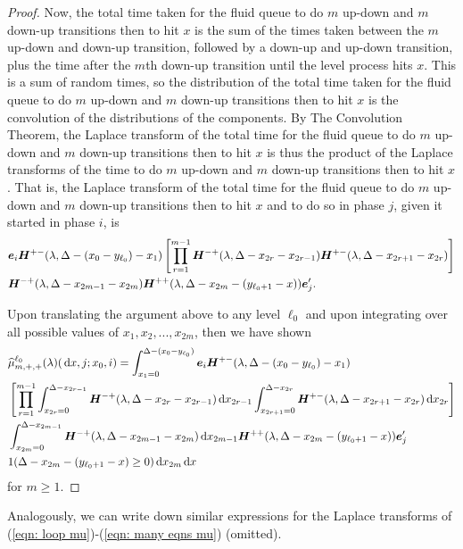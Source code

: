 \begin{proof}
Now, the total time taken for the fluid queue to do \(m\) up-down and \(m\) down-up transitions then to hit \(x\) is the sum of the times taken between the \(m\) up-down and down-up transition, followed by a down-up and up-down transition, plus the time after the \(m\)th down-up transition until the level process hits \(x\). This is a sum of random times, so the distribution of the total time taken for the fluid queue to do \(m\) up-down and \(m\) down-up transitions then to hit \(x\) is the convolution of the distributions of the components. By The Convolution Theorem, the Laplace transform of the total time for the fluid queue to do \(m\) up-down and \(m\) down-up transitions then to hit \(x\) is thus the product of the Laplace transforms of the time to do \(m\) up-down and \(m\) down-up transitions then to hit \(x\). That is, the Laplace transform of the total time for the fluid queue to do \(m\) up-down and \(m\) down-up transitions then to hit \(x\) and to do so in phase \(j\), given it started in phase \(i\), is
\begin{align*}
	\nonumber&\boldsymbol e_i \boldsymbol H^{+-}(\lambda,\Delta-(x_0-y_{\ell_0})-x_1)  
	\nonumber\left[\prod_{r=1}^{m-1}\boldsymbol H^{-+}(\lambda,\Delta-x_{2r}-x_{2r-1})\boldsymbol H^{+-}(\lambda,\Delta-x_{2r+1}-x_{2r})\right]
	\\& \boldsymbol H^{-+}(\lambda,\Delta -x_{2m-1} - x_{2m}) \boldsymbol H^{++}(\lambda,\Delta -x_{2m}- (y_{\ell_0+1}- x))\boldsymbol e_j'{}.
\end{align*} 

Upon translating the argument above to any level \(\ell_0\) and upon integrating over all possible values of \(x_1,x_2,...,x_{2m}\), then we have shown 
\begin{align}
	\nonumber&\widehat \mu^{\ell_0}_{m,+,+}(\lambda)( \, \mathrm{d} x,j;x_0,i) = \int_{x_1 = 0}^{\Delta-(x_0-y_{\ell_0})} \boldsymbol e_i \boldsymbol H^{+-}(\lambda,\Delta-(x_0-y_{\ell_0})-x_1)  
	\\&  \nonumber\left[\prod_{r=1}^{m-1} \int_{x_{2r}=0}^{\Delta-x_{2r-1}} \boldsymbol H^{-+}(\lambda,\Delta-x_{2r}-x_{2r-1})\, \mathrm{d} x_{2r-1}\int_{x_{2r+1}=0}^{\Delta-x_{2r}}\boldsymbol H^{+-}(\lambda,\Delta-x_{2r+1}-x_{2r})\, \mathrm{d} x_{2r}\right]
	\\& \int_{x_{2m}=0}^{\Delta-x_{2m-1}} \boldsymbol H^{-+}(\lambda,\Delta -x_{2m-1} - x_{2m}) \, \mathrm{d} x_{2m-1}\boldsymbol H^{++}(\lambda,\Delta -x_{2m}- (y_{\ell_0+1}- x))\boldsymbol e_j'{} \nonumber	
	\\& 1(\Delta-x_{2m}-(y_{\ell_0+1}-x)\geq 0)\, \mathrm{d} x_{2m} \, \mathrm{d} x \label{eqn: lst herwe}
\end{align} 
for \(m\geq 1\). 
\end{proof}
Analogously, we can write down similar expressions for the Laplace transforms of (\ref{eqn: loop mu})-(\ref{eqn: many eqns mu}) (omitted). 


